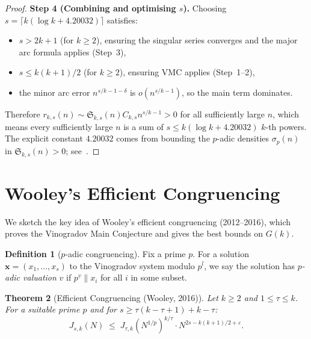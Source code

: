 \documentclass[12pt,a4paper]{amsart}
\newtheorem{theorem}{Theorem}[section]
\theoremstyle{definition}
\newtheorem{definition}[theorem]{Definition}
\begin{document}
\begin{proof}
  \textbf{Step 4 (Combining and optimising $s$).}
  Choosing $s = \lceil k(\log k + 4.20032)\rceil$ satisfies:
  \begin{itemize}
    \item $s > 2k+1$ (for $k \geq 2$), ensuring the singular series converges
      and the major arc formula applies (Step~3),
    \item $s \leq k(k+1)/2$ (for $k \geq 2$), ensuring VMC applies (Step~1--2),
    \item the minor arc error $n^{s/k-1-\delta}$ is $o(n^{s/k-1})$, so the
      main term dominates.
  \end{itemize}
  Therefore $r_{k,s}(n) \sim \mathfrak{S}_{k,s}(n) C_{k,s} n^{s/k-1} > 0$
  for all sufficiently large $n$, which means every sufficiently large $n$
  is a sum of $s \leq k(\log k + 4.20032)$ $k$-th powers.
  The explicit constant $4.20032$ comes from bounding the $p$-adic densities
  $\sigma_p(n)$ in $\mathfrak{S}_{k,s}(n) > 0$; see~\cite{Wooley2016}.
\end{proof}

\section{Wooley's Efficient Congruencing}
\label{sec:efficient}

We sketch the key idea of Wooley's efficient congruencing (2012--2016),
which proves the Vinogradov Main Conjecture and gives the best bounds on $G(k)$.

\begin{definition}[$p$-adic congruencing]
  Fix a prime $p$.  For a solution $\mathbf{x} = (x_1,\ldots,x_s)$ to
  the Vinogradov system modulo $p^l$, we say the solution has
  \emph{$p$-adic valuation} $v$ if $p^v \| x_i$ for all $i$ in some subset.
\end{definition}

\begin{theorem}[Efficient Congruencing (Wooley, 2016)]\label{thm:effcong}
  Let $k \geq 2$ and $1 \leq \tau \leq k$.  For a suitable prime $p$
  and for $s \geq \tau(k - \tau + 1) + k - \tau$:
  \[
    J_{s,k}(N) \;\leq\; J_{\tau,k}(N^{1/p})^{k/\tau}
                         \cdot N^{2s - k(k+1)/2 + \varepsilon}.
  \]
\end{theorem}
\end{document}
